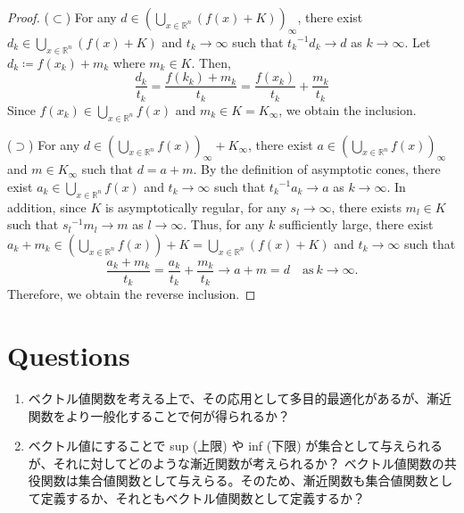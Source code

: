 \documentclass[a4paper,11pt]{jsarticle}
\theoremstyle{definition}
\newcommand{\NDemenstionalRealEuclideanSpace}{\mathbb{R}^n}
\begin{document}
\begin{proof}
  ($\subset$) For any $d \in (\bigcup_{x \in \NDemenstionalRealEuclideanSpace} (f(x) + K))_{\infty}$, 
  there exist $d_k \in \bigcup_{x \in \NDemenstionalRealEuclideanSpace} (f(x) + K)$ and $t_k \rightarrow \infty$ such that
  ${t_k}^{-1}d_k \rightarrow d$ as $k \rightarrow \infty$. Let $d_k \coloneqq f(x_k) + m_k$ where $m_k \in K$. Then,
  \begin{equation}
    \frac{d_k}{t_k} = \frac{f(k_k) + m_k}{t_k} = \frac{f(x_k)}{t_k} + \frac{m_k}{t_k} 
  \end{equation}
  Since $f(x_k) \in \bigcup_{x \in \NDemenstionalRealEuclideanSpace} f(x)$ and $m_k \in K = K_{\infty}$, we obtain the inclusion.

  ($\supset$) For any $d \in (\bigcup_{x \in \NDemenstionalRealEuclideanSpace} f(x))_{\infty} + K_{\infty}$, 
  there exist $a \in (\bigcup_{x \in \NDemenstionalRealEuclideanSpace} f(x))_{\infty}$ and $m \in K_{\infty}$ such that
  $d = a + m$. By the definition of asymptotic cones, there exist $a_k \in \bigcup_{x \in \NDemenstionalRealEuclideanSpace} f(x)$ and $t_k \rightarrow \infty$ such that
  ${t_k}^{-1}a_k \rightarrow a$ as $k \rightarrow \infty$. In addition, since $K$ is asymptotically regular, for any $s_l \rightarrow \infty$, there exists $m_l \in K$ such that
  ${s_l}^{-1}m_l \rightarrow m$ as $l \rightarrow \infty$. Thus, for any $k$ sufficiently large, there exist $a_k + m_k \in (\bigcup_{x \in \NDemenstionalRealEuclideanSpace} f(x)) + K = \bigcup_{x \in \NDemenstionalRealEuclideanSpace} (f(x) + K)$ 
  and $t_k \rightarrow \infty$ such that
  \begin{equation}
    \frac{a_k + m_k}{t_k} = \frac{a_k}{t_k} + \frac{m_k}{t_k} \rightarrow a + m = d \quad\text{as}\: k \rightarrow \infty.
  \end{equation}
  Therefore, we obtain the reverse inclusion.
\end{proof}

\section{Questions}

\begin{enumerate}
  \item ベクトル値関数を考える上で、その応用として多目的最適化があるが、漸近関数をより一般化することで何が得られるか？
  \item ベクトル値にすることで sup (上限) や inf (下限) が集合として与えられるが、それに対してどのような漸近関数が考えられるか？
ベクトル値関数の共役関数は集合値関数として与えらる。そのため、漸近関数も集合値関数として定義するか、それともベクトル値関数として定義するか？
\end{enumerate}
\end{document}

